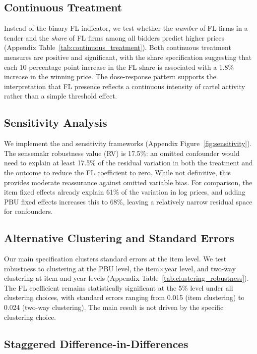 \subsection{Continuous Treatment}

Instead of the binary FL indicator, we test whether the \textit{number} of FL firms in a tender and the \textit{share} of FL firms among all bidders predict higher prices (Appendix Table~\ref{tab:continuous_treatment}). Both continuous treatment measures are positive and significant, with the share specification suggesting that each 10 percentage point increase in the FL share is associated with a 1.8\% increase in the winning price. The dose-response pattern supports the interpretation that FL presence reflects a continuous intensity of cartel activity rather than a simple threshold effect.

\subsection{Sensitivity Analysis}

We implement the \citet{oster2019unobservable} and \citet{cinelli2020making} sensitivity frameworks (Appendix Figure~\ref{fig:sensitivity}). The sensemakr robustness value (RV) is 17.5\%: an omitted confounder would need to explain at least 17.5\% of the residual variation in both the treatment and the outcome to reduce the FL coefficient to zero. While not definitive, this provides moderate reassurance against omitted variable bias. For comparison, the item fixed effects already explain 61\% of the variation in log prices, and adding PBU fixed effects increases this to 68\%, leaving a relatively narrow residual space for confounders.

\subsection{Alternative Clustering and Standard Errors}

Our main specification clusters standard errors at the item level. We test robustness to clustering at the PBU level, the item$\times$year level, and two-way clustering at item and year levels (Appendix Table~\ref{tab:clustering_robustness}). The FL coefficient remains statistically significant at the 5\% level under all clustering choices, with standard errors ranging from 0.015 (item clustering) to 0.024 (two-way clustering). The main result is not driven by the specific clustering choice.

\subsection{Staggered Difference-in-Differences}

